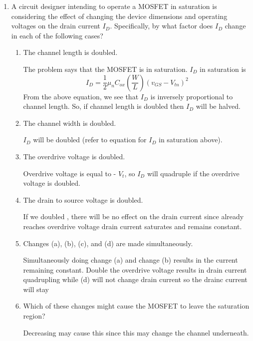 \begin{enumerate}
    \item A circuit designer intending to operate a MOSFET in saturation is considering the effect of changing the device dimensions and operating voltages on the drain current $I_D$. Specifically, by what factor does $I_D$ change in each of the following cases?
    \begin{enumerate}
        \item The channel length is doubled.
        \begin{Ans}
            The problem says that the MOSFET is in saturation. $I_D$ in saturation is 
                \[I_D = \frac{1}{2} \mu_n C_{ox} (\frac{W}{L}) (v_{GS} - V_{tn})^2\]
            From the above equation, we see that $I_D$ is inversely proportional to channel length. So, if channel length is doubled then $I_D$ will be halved.
        \end{Ans}

        \item The channel width is doubled.
        \begin{Ans}
            $I_D$ will be doubled (refer to equation for $I_D$ in saturation above).
        \end{Ans}

        \item The overdrive voltage is doubled.
        \begin{Ans}
            Overdrive voltage is equal to \vgs - $V_t$, so $I_D$ will quadruple if the overdrive voltage is doubled.
        \end{Ans}

        \item The drain to source voltage is doubled.
        \begin{Ans}
            If we doubled \vds, there will be no effect on the drain current since \vds already reaches overdrive voltage drain current saturates and remains constant.
        \end{Ans}

        \item Changes (a), (b), (c), and (d) are made simultaneously.
        \begin{Ans}
            Simultaneously doing change (a) and change (b) results in the current remaining constant. Double the overdrive voltage results in drain current quadrupling while (d) will not change drain current so the drainc current will stay 
        \end{Ans}

        \item Which of these changes might cause the MOSFET to leave the saturation region?
        \begin{Ans}
            Decreasing \vds may cause this since this may change the channel underneath.
        \end{Ans}
    \end{enumerate}
\end{enumerate}
